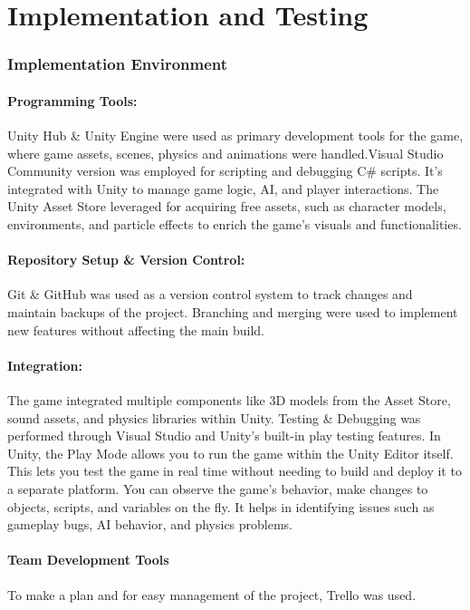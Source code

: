 \chapter{Implementation and Testing}
\subsection{Implementation Environment}
\subsubsection{Programming Tools:}
Unity Hub \& Unity Engine were used as primary development tools for the game, where game assets, scenes, physics and animations were handled.Visual Studio Community version was employed for scripting and debugging C\# scripts. It's integrated with Unity to manage game logic, AI, and player interactions.
The Unity Asset Store leveraged for acquiring free assets, such as character models, environments, and particle effects to enrich the game's visuals and functionalities.
\subsubsection{Repository Setup \& Version Control:}
Git \& GitHub was used as a version control system to track changes and maintain backups of the project. Branching and merging were used to implement new features without affecting the main build.
\subsubsection{Integration:}
The game integrated multiple components like 3D models from the Asset Store, sound assets, and physics libraries within Unity.
Testing \& Debugging was performed through Visual Studio and Unity’s built-in play testing features.
In Unity, the Play Mode allows you to run the game within the Unity Editor itself. This lets you test the game in real time without needing to build and deploy it to a separate platform.
You can observe the game’s behavior, make changes to objects, scripts, and variables on the fly.
It helps in identifying issues such as gameplay bugs, AI behavior, and physics problems.
\subsubsection{Team Development Tools}
To make a plan and for easy management of the project, Trello was used.